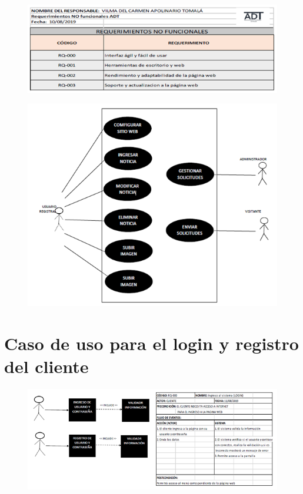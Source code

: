 \documentclass[12pt,a4paper]{article}
\begin{document}
\begin{figure}[hbtp]
\caption{}
\centering
\includegraphics[scale=0.5]{TERCERA.png}
\end{figure}


\begin{figure}[hbtp]
\caption{}
\centering
\includegraphics[scale=0.5]{CUARTA.png}
\end{figure}


\section*{Caso de uso para el login y registro del cliente}
\begin{figure}[hbtp]
\caption{}
\centering
\includegraphics[scale=0.7]{QUINTA.png}
\end{figure}
\end{document}
